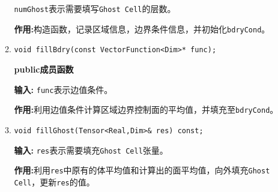 \documentclass[UTF8]{ctexart}
\theoremstyle{plain}
\theoremstyle{definition}
\theoremstyle{remark}
\begin{document}
\begin{itemize}
\begin{enumerate}
        \texttt{numGhost}表示需要填写\texttt{Ghost Cell}的层数。

        \textbf{作用:}构造函数，记录区域信息，边界条件信息，并初始化\texttt{bdryCond}。

        \item \texttt{void fillBdry(const VectorFunction<Dim>* func);}
        
        \textbf{public成员函数}

        \textbf{输入:} \texttt{func}表示边值条件。

        \textbf{作用:}利用边值条件计算区域边界控制面的平均值，并填充至\texttt{bdryCond}。

        \item \texttt{void fillGhost(Tensor<Real,Dim>\& res) const;}
        
        \textbf{输入:} \texttt{res}表示需要填充\texttt{Ghost Cell}张量。

        \textbf{作用:}利用\texttt{res}中原有的体平均值和计算出的面平均值，向外填充\texttt{Ghost Cell}，更新\texttt{res}的值。
    \end{enumerate}
\end{itemize}
\end{document}
